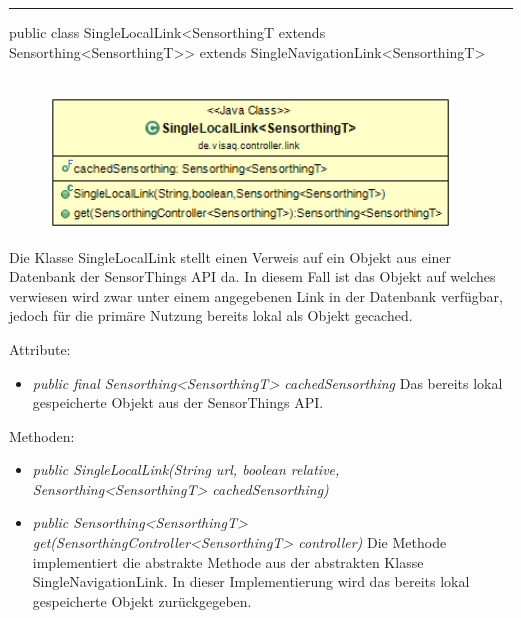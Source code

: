 \rule{\textwidth}{0.4pt}
public class SingleLocalLink<SensorthingT extends Sensorthing<SensorthingT>> extends SingleNavigationLink<SensorthingT>
\\\\
\begin{minipage}{0.5\textwidth}
    \begin{figure}[H]
        {\centering\includegraphics[width=0.95\textwidth]{media/backend/controller/classes/SingleLocalLink.png}}
    \end{figure}
    \end{minipage} \hfill
\begin{minipage}{0.5\textwidth}
    Die Klasse SingleLocalLink stellt einen Verweis auf ein Objekt aus einer Datenbank der \gls{SensorThings API} da.
    In diesem Fall ist das Objekt auf welches verwiesen wird zwar unter einem angegebenen Link in der Datenbank verfügbar, jedoch für die primäre Nutzung bereits lokal als Objekt gecached.
\end{minipage}

Attribute:
\begin{itemize}
    \item \emph{public final Sensorthing<SensorthingT> cachedSensorthing} Das bereits lokal gespeicherte Objekt aus der \gls{SensorThings API}.
\end{itemize}
Methoden:
\begin{itemize}
    \item \emph{public SingleLocalLink(String url, boolean relative, Sensorthing<SensorthingT> cachedSensorthing)}
    \relativeDescription
    \item \emph{public Sensorthing<SensorthingT> get(SensorthingController<SensorthingT> controller)}
    Die Methode implementiert die abstrakte Methode aus der abstrakten Klasse SingleNavigationLink. In dieser Implementierung wird das bereits lokal gespeicherte Objekt zurückgegeben.
\end{itemize}

